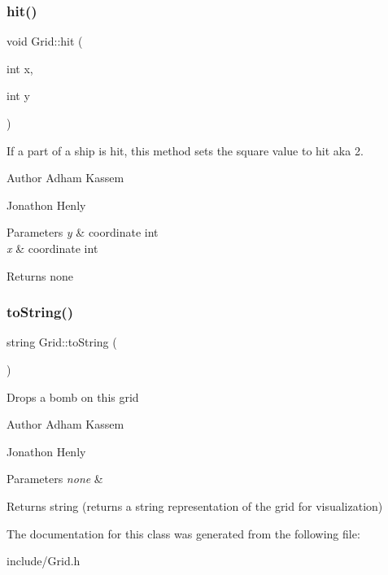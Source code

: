 \subsubsection{\texorpdfstring{hit()}{hit()}}
{\footnotesize\ttfamily void Grid\+::hit (\begin{DoxyParamCaption}\item[{int}]{x,  }\item[{int}]{y }\end{DoxyParamCaption})\hspace{0.3cm}{\ttfamily [inline]}}

If a part of a ship is hit, this method sets the square value to hit aka 2. \begin{DoxyAuthor}{Author}
Adham Kassem 

Jonathon Henly 
\end{DoxyAuthor}

\begin{DoxyParams}{Parameters}
{\em y} & coordinate int \\
\hline
{\em x} & coordinate int \\
\hline
\end{DoxyParams}
\begin{DoxyReturn}{Returns}
none 
\end{DoxyReturn}
\mbox{\label{classGrid_adde29f8454547c9e81ce2b3c2e95bc43}} 
\subsubsection{\texorpdfstring{to\+String()}{toString()}}
{\footnotesize\ttfamily string Grid\+::to\+String (\begin{DoxyParamCaption}{ }\end{DoxyParamCaption})\hspace{0.3cm}{\ttfamily [inline]}}

Drops a bomb on this grid \begin{DoxyAuthor}{Author}
Adham Kassem 

Jonathon Henly 
\end{DoxyAuthor}

\begin{DoxyParams}{Parameters}
{\em none} & \\
\hline
\end{DoxyParams}
\begin{DoxyReturn}{Returns}
string (returns a string representation of the grid for visualization) 
\end{DoxyReturn}


The documentation for this class was generated from the following file\+:\begin{DoxyCompactItemize}
\item 
include/Grid.\+h\end{DoxyCompactItemize}
